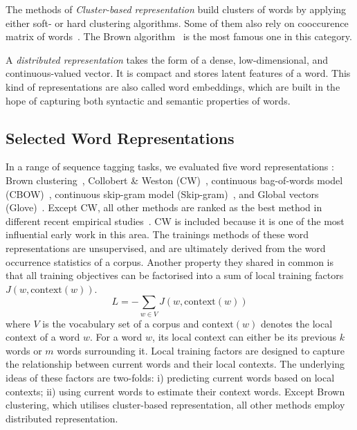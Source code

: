 The methods of \textit{Cluster-based representation} build clusters of words by applying either soft- or hard clustering algorithms. Some of them also rely on cooccurence matrix of words~\cite{}. The Brown algorithm~\cite{Brown92class-basedn-gram} is the most famous one in this category.

A \textit{distributed representation} takes the form of a dense, low-dimensional, and continuous-valued vector. It is compact and stores latent features of a word. This kind of representations are also called word embeddings, which are built in the hope of capturing both syntactic and semantic properties of words.

\subsection{Selected Word Representations}
In a range of sequence tagging tasks, we evaluated five word representations : Brown clustering~\cite{Brown92class-basedn-gram}, Collobert \& Weston (CW)~\cite{collobert2011natural}, continuous bag-of-words model (CBOW)~\cite{}, continuous skip-gram model (Skip-gram)~\cite{}, and Global vectors (Glove)~\cite{}. Except CW, all other methods are ranked as the best method in different recent empirical studies~\cite{}. CW is included because it is one of the most influential early work in this area. The trainings methods of these word representations are unsupervised, and are ultimately derived from the word occurrence statistics of a corpus. Another property they shared in common is that all training objectives can be factorised into a sum of local training factors $J(w, \text{context}(w))$. 
\begin{equation}
L = - \sum_{w \in V} J(w, \text{context}(w))
\end{equation}
where $V$ is the vocabulary set of a corpus and $\text{context}(w)$ denotes the local context of a word $w$. For a word $w$, its local context can either be its previous $k$ words or $m$ words surrounding it. Local training factors are designed to capture the relationship between current words and their local contexts. The underlying ideas of these factors are two-folds: i) predicting current words based on local contexts; ii) using current words to estimate their context words. Except Brown clustering, which utilises cluster-based representation, all other methods employ distributed representation.

